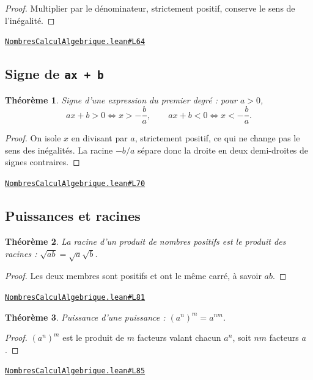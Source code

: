 \documentclass[11pt,a4paper]{article}
\theoremstyle{definition}
\theoremstyle{plain}
\newtheorem{theoreme}{Théorème}
\newcommand{\source}[2]{\par\smallskip\noindent\hfill{\footnotesize\href{#1}{\texttt{#2}}}\par\smallskip}
\begin{document}
\begin{proof}
Multiplier par le dénominateur, strictement positif, conserve le sens de
l'inégalité.
\end{proof}
\source{https://github.com/Commutator-IO/learn-lean/blob/main/cours/02-lycee/01-nombres-calcul-algebrique/NombresCalculAlgebrique.lean\#L64}{NombresCalculAlgebrique.lean\#L64}

\subsection{Signe de \texttt{ax + b}}

\begin{theoreme}
Signe d'une expression du premier degré : pour $a > 0$,
\[ ax + b > 0 \iff x > -\frac{b}{a}, \qquad ax + b < 0 \iff x < -\frac{b}{a} . \]
\end{theoreme}

\begin{proof}
On isole $x$ en divisant par $a$, strictement positif, ce qui ne change pas le sens des
inégalités. La racine $-b/a$ sépare donc la droite en deux demi-droites de signes
contraires.
\end{proof}
\source{https://github.com/Commutator-IO/learn-lean/blob/main/cours/02-lycee/01-nombres-calcul-algebrique/NombresCalculAlgebrique.lean\#L70}{NombresCalculAlgebrique.lean\#L70}

\subsection{Puissances et racines}

\begin{theoreme}
La racine d'un produit de nombres positifs est le produit des racines :
$\sqrt{ab} = \sqrt a \sqrt b$.
\end{theoreme}

\begin{proof}
Les deux membres sont positifs et ont le même carré, à savoir $ab$.
\end{proof}
\source{https://github.com/Commutator-IO/learn-lean/blob/main/cours/02-lycee/01-nombres-calcul-algebrique/NombresCalculAlgebrique.lean\#L81}{NombresCalculAlgebrique.lean\#L81}

\begin{theoreme}
Puissance d'une puissance : $(a^n)^m = a^{nm}$.
\end{theoreme}

\begin{proof}
$(a^n)^m$ est le produit de $m$ facteurs valant chacun $a^n$, soit $nm$ facteurs
$a$.
\end{proof}
\source{https://github.com/Commutator-IO/learn-lean/blob/main/cours/02-lycee/01-nombres-calcul-algebrique/NombresCalculAlgebrique.lean\#L85}{NombresCalculAlgebrique.lean\#L85}
\end{document}
